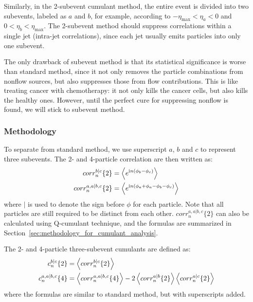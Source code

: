 Similarly, in the 2-subevent cumulant method, the entire event is divided into two subevents, labeled as $a$ and $b$, for example, according to $-\eta_\text{max}<\eta_a<0$ and $0<\eta_b<\eta_\text{max}$. The 2-subevent method should suppress correlations within a single jet (intra-jet correlations), since each jet usually emits particles into only one subevent.

The only drawback of subevent method is that its statistical significance is worse than standard method, since it not only removes the particle combinations from nonflow sources, but also suppresses those from flow contributions. This is like treating cancer with chemotherapy: it not only kills the cancer cells, but also kills the healthy ones. However, until the perfect cure for suppressing nonflow is found, we will stick to subevent method.



\subsubsection{Methodology}

To separate from standard method, we use superscript $a$, $b$ and $c$ to represent three subevents. The 2- and 4-particle correlation are then written as:
\begin{equation}
\begin{split}
corr_n^{b|c}\{2\} &= \left\langle e^{\text{i}n(\phi_b-\phi_c)}\right\rangle \\
corr_n^{a,a|b,c}\{2\} &= \left\langle e^{\text{i}n(\phi_a+\phi_a-\phi_b-\phi_c)}\right\rangle
\end{split}
\end{equation}
where $|$ is used to denote the sign before $\phi$ for each particle. Note that all particles are still required to be distinct from each other. $corr_n^{a,a|b,c}\{2\}$ can also be calculated using Q-cumulant technique, and the formulas are summarized in Section~\ref{sec:methodology_for_cumulant_analysis}.

The 2- and 4-particle three-subevent cumulants are defined as:
\begin{equation}
\begin{split}
c_n^{b|c}\{2\} &= \left\langle corr_n^{b|c}\{2\}\right\rangle \\
c_n^{a,a|b,c}\{4\} &= \left\langle corr_n^{a,a|b,c}\{4\}\right\rangle - 2\left\langle corr_n^{a|b}\{2\}\right\rangle\left\langle corr_n^{a|c}\{2\}\right\rangle
\end{split}
\end{equation}
where the formulas are similar to standard method, but with superscripts added.

